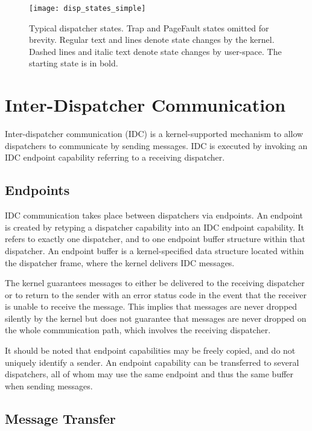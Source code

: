 \documentclass{scrreprt}
\begin{document}
  \begin{figure}
    \centering
    \texttt{[image: disp\_states\_simple]}
    \caption[Typical dispatcher states]{Typical dispatcher states.
      Trap and PageFault states
      omitted for brevity. Regular text and lines denote state changes
      by the kernel. Dashed lines and italic text denote state changes
      by user-space. The starting state is in bold.}
    \label{fig:dispstates}
  \end{figure}

  \section{Inter-Dispatcher Communication}\label{sec:IDC}

  Inter-dispatcher communication (IDC) is a kernel-supported mechanism
  to allow dispatchers to communicate by sending messages. IDC is
  executed by invoking an IDC endpoint capability referring to a
  receiving dispatcher.

  \subsection{Endpoints}

  IDC communication takes place between dispatchers via endpoints.
  An endpoint is created by retyping a dispatcher capability
  into an IDC endpoint capability. It refers to exactly one dispatcher, and
  to one endpoint buffer structure within that dispatcher.
  An endpoint buffer is a kernel-specified data structure located within the
  dispatcher frame, where the kernel delivers IDC messages.

  The kernel guarantees messages to either be delivered to the
  receiving dispatcher or to return to the sender with an error status
  code in the event that the receiver is unable to receive the message.
  This implies that messages are never dropped silently by the kernel but does
  not guarantee that messages are never dropped on the whole communication path,
  which involves the receiving dispatcher.

  It should be noted that endpoint capabilities may be freely copied, and do not
  uniquely identify a sender. An endpoint capability can be
  transferred to several dispatchers, all of whom may use the same
  endpoint and thus the same buffer when sending messages.

  \subsection{Message Transfer}
\end{document}
